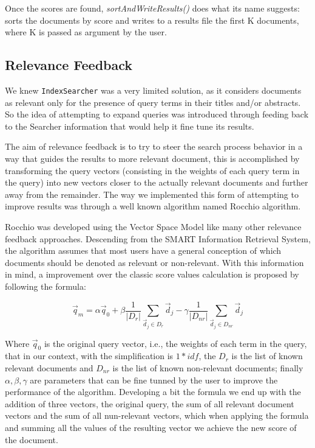 \documentclass[12pt]{article}
\begin{document}
Once the scores are found, \textit{sortAndWriteResults()} does what its name 
suggests: sorts the documents by score and writes to a results file the first K
documents, where K is passed as argument by the user.

\subsection{Relevance Feedback}

We knew \texttt{IndexSearcher} was a very limited solution, as it considers 
documents as relevant only for the presence of query terms in their titles 
and/or abstracts.
So the idea of attempting to expand queries was introduced through feeding back
to the Searcher information that would help it fine tune its results.

The aim of relevance feedback is to try to steer the search process behavior in a way that guides the results to more relevant document, this is accomplished by transforming the query vectors (consisting in the
weights of each query term in the query) into new vectors closer to the actually
relevant documents and further away from the remainder.
The way we implemented this form of attempting to improve results was through 
a well known algorithm named Rocchio algorithm.

Rocchio was developed using the Vector Space Model like many other relevance feedback approaches. Descending from the SMART Information Retrieval System, the algorithm assumes that most users have a general conception of which documents should be denoted as relevant or non-relevant. With this information in mind, a improvement over the classic score values calculation is proposed by following the formula:

\begin{equation}
  \vec{q}_{m} = \alpha\vec{q}_{0} + \beta\frac{1}{|D_{r}|} \sum_{ \vec{d}_{j} \in D_{r}} \vec{d}_{j} - \gamma\frac{1}{|D_{nr}|} \sum_{ \vec{d}_{j} \in D_{nr}} \vec{d}_{j}
\end{equation}

Where $\vec{q}_{0}$ is the original query vector, i.e., the weights of each term in the query, that in our context, with the simplification is $1*idf$, the $D_{r}$ is the list of known relevant documents and $D_{nr}$ is the list of known non-relevant documents; finally $\alpha, \beta, \gamma$ are parameters that can be fine tunned by the user to improve the performance of the algorithm. Developing a bit the formula we end up with the addition of three vectors, the original query, the sum of all relevant document vectors and the sum of all nun-relevant vectors, which when applying the formula and summing all the values of the resulting vector we achieve the new score of the document.
\end{document}
